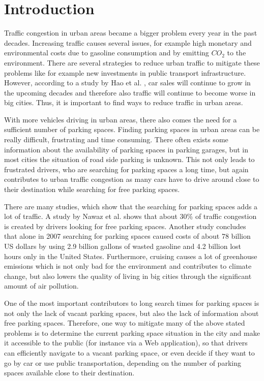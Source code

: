 \chapter{Introduction}
\label{chap:introduction}


Traffic congestion in urban areas became a bigger problem every year in the past decades. Increasing traffic causes several issues, for example high monetary and environmental costs due to gasoline consumption and by emitting $CO_2$ to the environment. There are several strategies to reduce urban traffic to mitigate these problems like for example new investments in public transport infrastructure. However, according to a study by Hao et al. \cite{HAO2016121}, car sales will continue to grow in the upcoming decades and therefore also traffic will continue to become worse in big cities. Thus, it is important to find ways to reduce traffic in urban areas.

With more vehicles driving in urban areas, there also comes the need for a sufficient number of parking spaces. Finding parking spaces in urban areas can be really difficult, frustrating and time consuming. There often exists some information about the availability of parking spaces in parking garages, but in most cities the situation of road side parking is unknown. This not only leads to frustrated drivers, who are searching for parking spaces a long time, but again contributes to urban traffic congestion as many cars have to drive around close to their destination while searching for free parking spaces. 

There are many studies, which show that the searching for parking spaces adds a lot of traffic. A study by Nawaz et al. \cite{Nawaz:2013:PSB:2500423.2500438} shows that about 30\% of traffic congestion is created by drivers looking for free parking spaces. Another study \cite{TexasMobilityReport} concludes that alone in 2007 searching for parking spaces caused costs of about 78 billion US dollars by using 2.9 billion gallons of wasted gasoline and 4.2 billion lost hours only in the United States. Furthermore, cruising causes a lot of greenhouse emissions which is not only bad for the environment and contributes to climate change, but also lowers the quality of living in big cities through the significant amount of air pollution.

One of the most important contributors to long search times for parking spaces is not only the lack of vacant parking spaces, but also the lack of information about free parking spaces. Therefore, one way to mitigate many of the above stated problems is to determine the current parking space situation in the city and make it accessible to the public (for instance via a Web application), so that drivers can efficiently navigate to a vacant parking space, or even decide if they want to go by car or use public transportation, depending on the number of parking spaces available close to their destination. 




